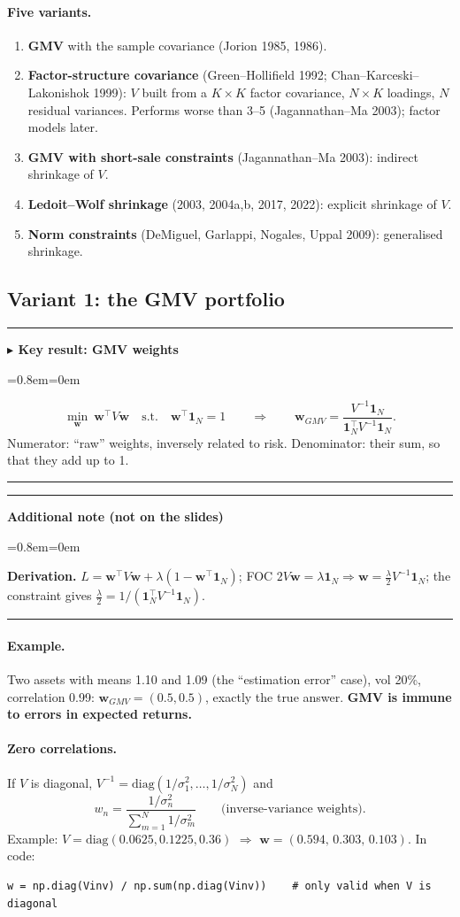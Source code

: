 \documentclass[11pt,a4paper]{report}
\newenvironment{notebox}[1]
  {\par\medskip\Needspace{6\baselineskip}\noindent\rule{\linewidth}{0.4pt}\par\nopagebreak
   \noindent\textbf{#1}\par\nopagebreak
   \begin{list}{}{\leftmargin=0.8em\rightmargin=0em\topsep=2pt}\item[]}
  {\end{list}\nopagebreak\noindent\rule{\linewidth}{0.4pt}\par\medskip}
\newenvironment{keybox}[1][]{\begin{notebox}{$\blacktriangleright$ Key result#1}}{\end{notebox}}
\newenvironment{addnote}{\begin{notebox}{Additional note (not on the slides)}}{\end{notebox}}
\newcommand{\one}{\mathbf{1}_N}
\newcommand{\w}{\bm{w}}
\newcommand{\T}{^{\top}}
\begin{document}
\paragraph{Five variants.}
\begin{enumerate}
  \item \textbf{GMV} with the sample covariance (Jorion 1985, 1986).
  \item \textbf{Factor-structure covariance} (Green--Hollifield 1992; Chan--Karceski--Lakonishok 1999):
    $V$ built from a $K\times K$ factor covariance, $N\times K$ loadings, $N$ residual variances.
    Performs worse than 3--5 (Jagannathan--Ma 2003); factor models later.
  \item \textbf{GMV with short-sale constraints} (Jagannathan--Ma 2003): indirect shrinkage of $V$.
  \item \textbf{Ledoit--Wolf shrinkage} (2003, 2004a,b, 2017, 2022): explicit shrinkage of $V$.
  \item \textbf{Norm constraints} (DeMiguel, Garlappi, Nogales, Uppal 2009): generalised shrinkage.
\end{enumerate}

\subsection{Variant 1: the GMV portfolio}
\begin{keybox}[: GMV weights]
\[
\min_{\w}\ \w\T V\w\quad\text{s.t.}\quad\w\T\one=1
\qquad\Rightarrow\qquad
\w_{GMV}=\frac{V^{-1}\one}{\one\T V^{-1}\one}.
\]
Numerator: ``raw'' weights, inversely related to risk. Denominator: their sum, so that they add up to 1.
\end{keybox}
\begin{addnote}
\textbf{Derivation.} $L=\w\T V\w+\lambda(1-\w\T\one)$; FOC $2V\w=\lambda\one\Rightarrow\w=\frac\lambda2V^{-1}\one$;
the constraint gives $\frac\lambda2=1/(\one\T V^{-1}\one)$.
\end{addnote}

\paragraph{Example.} Two assets with means 1.10 and 1.09 (the ``estimation error''
case), vol 20\%, correlation 0.99: $\w_{GMV}=(0.5,0.5)$, exactly the true
answer. \textbf{GMV is immune to errors in expected returns.}

\paragraph{Zero correlations.} If $V$ is diagonal, $V^{-1}=\text{diag}(1/\sigma_1^2,\dots,1/\sigma_N^2)$ and
\[
w_n=\frac{1/\sigma_n^2}{\sum_{m=1}^N1/\sigma_m^2}\qquad\text{(inverse-variance weights).}
\]
Example: $V=\text{diag}(0.0625,0.1225,0.36)$ $\Rightarrow$ $\w=(0.594,\,0.303,\,0.103)$.
In code:
\begin{lstlisting}
w = np.diag(Vinv) / np.sum(np.diag(Vinv))    # only valid when V is diagonal
\end{lstlisting}
\end{document}
